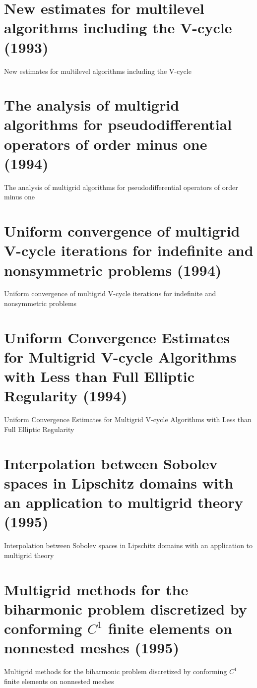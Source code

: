 \section{New estimates for multilevel algorithms including the V-cycle (1993)}
New estimates for multilevel algorithms including the V-cycle\cite{bramble1993new}


\section{The analysis of multigrid algorithms for pseudodifferential operators of order minus one (1994)}
The analysis of multigrid algorithms for pseudodifferential operators of order minus one\cite{bramble1994analysis}


\section{Uniform convergence of multigrid V-cycle iterations for indefinite and nonsymmetric problems (1994) }
Uniform convergence of multigrid V-cycle iterations for indefinite and nonsymmetric problems\cite{bramble1994uniforma}



\section{Uniform Convergence Estimates for Multigrid V-cycle Algorithms with Less than Full Elliptic Regularity (1994)}
Uniform Convergence Estimates for Multigrid V-cycle Algorithms with Less than Full Elliptic Regularity\cite{bramble1994uniformb}



\section{Interpolation between Sobolev spaces in Lipschitz domains with an application to multigrid theory (1995)}
Interpolation between Sobolev spaces in Lipschitz domains with an application to multigrid theory\cite{bramble1995interpolation}



\section{Multigrid methods for the biharmonic problem discretized by conforming $C^1$ finite elements on nonnested meshes (1995)}
Multigrid methods for the biharmonic problem discretized by conforming $C^1$ finite elements on nonnested meshes\cite{bramble1995multigrid}




